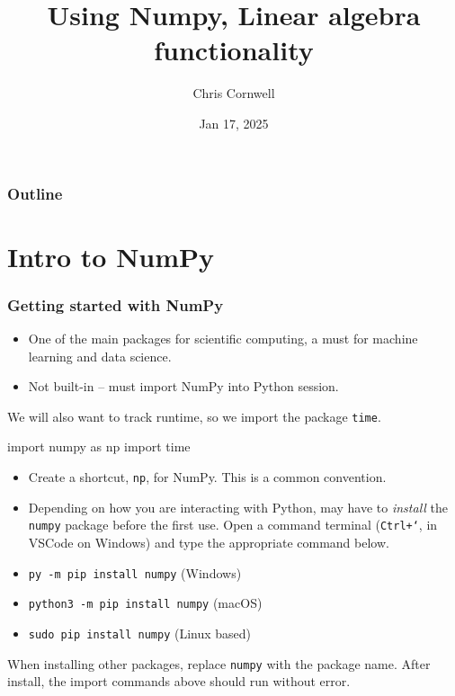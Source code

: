 \documentclass{beamer}
\author{Chris Cornwell}
\date{Jan 17, 2025}
\title{Using Numpy, Linear algebra functionality}
\newenvironment{codeblock}
    {\hfill\begin{beamerboxesrounded}[lower=codecol, width=0.8\textwidth]
    \medskip

    }
    { 
    \end{beamerboxesrounded}\hfill
    }
\theoremstyle{example}
\newcommand{\ttt}[1]{{\small\texttt{#1}}}
\begin{document}
\begin{frame}
\titlepage
\end{frame}

\begin{frame}
\frametitle{Outline}
\tableofcontents
\end{frame}

\section{Intro to NumPy}

\begin{frame}[fragile]
\frametitle{Getting started with NumPy}
\begin{itemize}
    \item One of the main packages for scientific computing, a must for machine learning and data science. 
    \item Not built-in {--} must import NumPy into Python session. 
\end{itemize}
We will also want to track runtime, so we import the package \ttt{time}.

\begin{codeblock}

\begin{python}
    import numpy as np
    import time
\end{python}

\end{codeblock}

\begin{itemize}
    \item[] Create a shortcut, \ttt{np}, for NumPy. This is a common convention.
\end{itemize}

\begin{itemize}
	\item Depending on how you are interacting with Python, may have to \emph{install} the \ttt{numpy} package before the first use. Open a command terminal (\ttt{Ctrl+`}, in VSCode on Windows) and type the appropriate command below.
\end{itemize}
\begin{itemize}
	\item[] \ttt{py -m pip install numpy} (Windows)
	\item[] \ttt{python3 -m pip install numpy} (macOS)
    \item[] \ttt{sudo pip install numpy} (Linux based)
\end{itemize}
When installing other packages, replace \ttt{numpy} with the package name. After install, the import commands above should run without error.

\end{frame}
\end{document}
